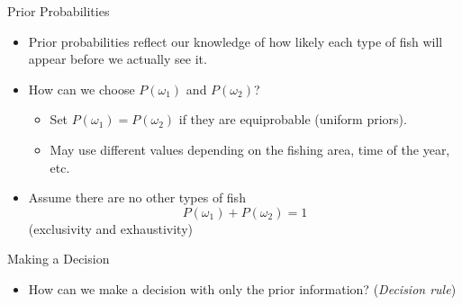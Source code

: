 \begin{frame}{Prior Probabilities}
\begin{itemize}
\setlength{\itemsep}{12pt}
\item Prior probabilities reflect our knowledge of how likely each type of fish will appear before we actually see it.
\item How can we choose $P(\omega_1)$ and $P(\omega_2)$?
\begin{itemize}
\item Set $P(\omega_1)=P(\omega_2)$ if they are equiprobable ({\color{mycolor1}uniform priors}).
\item May use different values depending on the fishing area, time of the year, etc.
\end{itemize}
\item Assume there are no other types of fish
\[\boxed{P(\omega_1)+P(\omega_2)=1}\]
(exclusivity and exhaustivity)
\end{itemize}
\end{frame}

\begin{frame}{Making a Decision}
\begin{itemize}
\item How can we make a decision with only the prior
information? (\textit{\color{mycolor1}Decision rule})
\end{itemize}
\end{frame}


